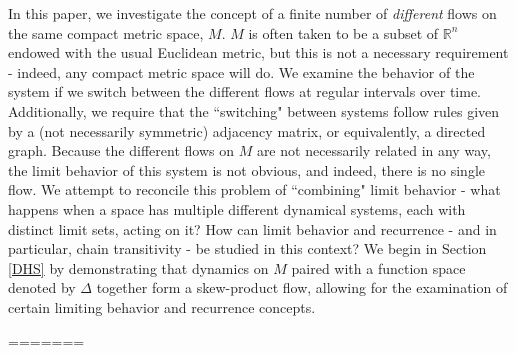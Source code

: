 \documentclass[11pt]{article}
\begin{document}
\indent In this paper, we investigate the concept of a finite number of \emph{different} flows on the same compact metric space, $M$.  $M$ is often taken to be a subset of $\mathbb{R}^n$ endowed with the usual Euclidean metric, but this is not a necessary requirement - indeed, any compact metric space will do.  We examine the behavior of the system if we switch between the different flows at regular intervals over time.  Additionally, we require that the ``switching" between systems follow rules given by a (not necessarily symmetric) adjacency matrix, or equivalently, a directed graph.  Because the different flows on $M$ are not necessarily related in any way, the limit behavior of this system is not obvious, and indeed, there is no single flow.  We attempt to reconcile this problem of ``combining" limit behavior - what happens when a space has multiple different dynamical systems, each with distinct limit sets, acting on it?  How can limit behavior and recurrence - and in particular, chain transitivity - be studied in this context? We begin in Section \ref{DHS} by demonstrating that dynamics on $M$ paired with a function space denoted by $\Delta$ together form a skew-product flow, allowing for the examination of certain limiting behavior and recurrence concepts. 

=======
\end{document}
